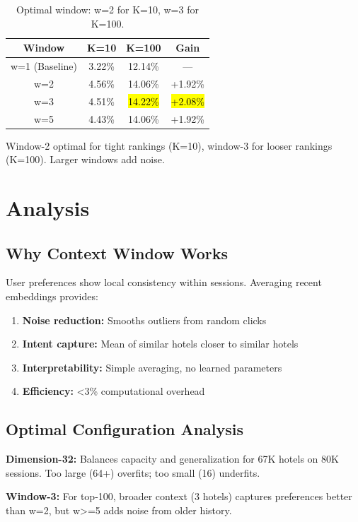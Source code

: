 \documentclass[sigconf]{acmart}
\begin{document}
\begin{table}[h]
\centering
\small
\begin{tabular}{cccc}
\toprule
\textbf{Window} & \textbf{K=10} & \textbf{K=100} & \textbf{Gain} \\
\midrule
w=1 (Baseline) & 3.22\% & 12.14\% & — \\
w=2 & 4.56\% & 14.06\% & +1.92\% \\
w=3 & 4.51\% & \hl{14.22\%} & \hl{+2.08\%} \\
w=5 & 4.43\% & 14.06\% & +1.92\% \\
\bottomrule
\end{tabular}
\caption{Optimal window: w=2 for K=10, w=3 for K=100.}
\label{tab:windows}
\end{table}

Window-2 optimal for tight rankings (K=10), window-3 for looser rankings (K=100). Larger windows add noise.

\section{Analysis}

\subsection{Why Context Window Works}

User preferences show local consistency within sessions. Averaging recent embeddings provides:

\begin{enumerate}
\item \textbf{Noise reduction:} Smooths outliers from random clicks
\item \textbf{Intent capture:} Mean of similar hotels closer to similar hotels
\item \textbf{Interpretability:} Simple averaging, no learned parameters
\item \textbf{Efficiency:} <3\% computational overhead
\end{enumerate}

\subsection{Optimal Configuration Analysis}

\textbf{Dimension-32:} Balances capacity and generalization for 67K hotels on 80K sessions. Too large (64+) overfits; too small (16) underfits.

\textbf{Window-3:} For top-100, broader context (3 hotels) captures preferences better than w=2, but w>=5 adds noise from older history.
\end{document}
